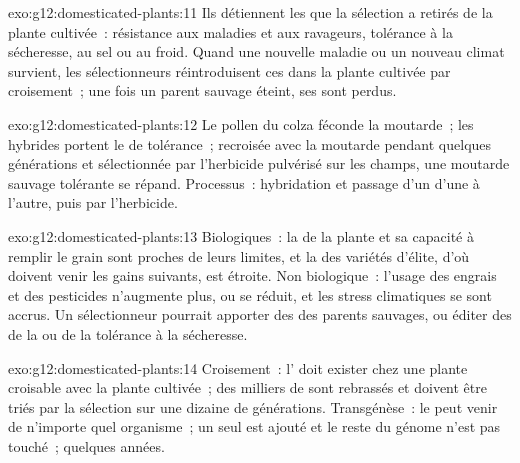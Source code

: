 \begin{solution}{exo:g12:domesticated-plants:11}
Ils détiennent les  que la sélection a retirés de la plante
cultivée~: résistance aux maladies et aux ravageurs, tolérance à la
sécheresse, au sel ou au froid. Quand une nouvelle maladie ou un
nouveau climat survient, les sélectionneurs réintroduisent ces 
dans la plante cultivée par croisement~; une fois un parent sauvage
éteint, ses  sont perdus.
\end{solution}

\begin{solution}{exo:g12:domesticated-plants:12}
Le pollen du colza féconde la moutarde~; les hybrides portent le 
de tolérance~; recroisée avec la moutarde pendant quelques générations
et sélectionnée par l'herbicide pulvérisé sur les champs, une moutarde
sauvage tolérante se répand. Processus~: hybridation et passage d'un
 d'une  à l'autre, puis  par
l'herbicide.
\end{solution}

\begin{solution}{exo:g12:domesticated-plants:13}
Biologiques~: la  de la plante et sa capacité à remplir
le grain sont proches de leurs limites, et la  des
variétés d'élite, d'où doivent venir les gains suivants, est étroite.
Non biologique~: l'usage des engrais et des pesticides n'augmente plus,
ou se réduit, et les stress climatiques se sont accrus. Un
sélectionneur pourrait apporter des  des parents sauvages, ou
éditer des  de la  ou de la tolérance à la
sécheresse.
\end{solution}

\begin{solution}{exo:g12:domesticated-plants:14}
Croisement~: l' doit exister chez une plante croisable avec la
plante cultivée~; des milliers de  sont rebrassés et doivent être
triés par la sélection sur une dizaine de générations. Transgénèse~:
le  peut venir de n'importe quel organisme~; un seul  est
ajouté et le reste du génome n'est pas touché~; quelques années.
\end{solution}

